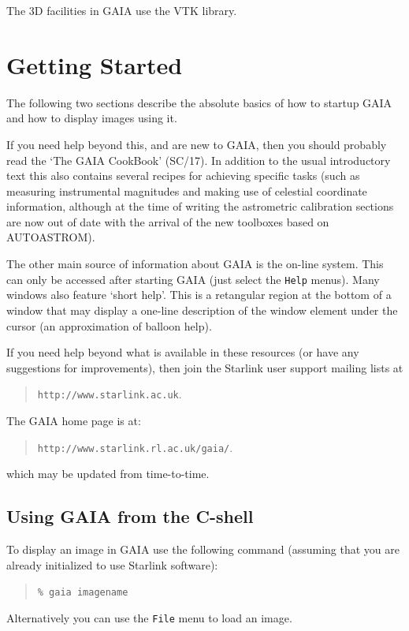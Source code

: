\documentclass[twoside,11pt]{article}
\newcommand{\htmladdnormallink}[2]{#1}
\newcommand{\xref}[3]{#1}
\newcommand{\xlabel}[1]{}
\renewcommand{\_}{\texttt{\symbol{95}}}
\newcommand{\mytt}[1]{{\texttt{#1}}}
\begin{document}
The 3D facilities in GAIA use the
\htmladdnormallink{VTK}{http://www.kitware.com} library.

\section{\xlabel{getting_started}Getting Started}

The following two sections describe the absolute basics of how to
startup GAIA and how to display images using it.

If you need help beyond this, and are new to GAIA, then you should probably
read the `The GAIA CookBook' (\xref{SC/17}{sc17}{}). In addition to the usual
introductory text this also contains several recipes for achieving specific
tasks (such as measuring instrumental magnitudes and making use of celestial
coordinate information, although at the time of writing the astrometric
calibration sections are now out of date with the arrival of the new toolboxes
based on AUTOASTROM).

The other main source of information about GAIA is the on-line
system. This can only be accessed after starting GAIA (just select the
\mytt{Help} menus). Many windows also feature `short help'. This is a
retangular region at the bottom of a window that may display a
one-line description of the window element under the cursor (an
approximation of balloon help).

If you need help beyond what is available in these resources (or have
any suggestions for improvements), then join the Starlink user support
mailing lists at
\begin{quote}
\htmladdnormallink{\mytt{http://www.starlink.ac.uk}}{http://www.starlink.ac.uk}.
\end{quote}
The GAIA home page is at:
\begin{quote}
\htmladdnormallink{\mytt{http://www.starlink.rl.ac.uk/gaia/}}{http://www.starlink.rl.ac.uk/gaia/}.
\end{quote}
which may be updated from time-to-time. 

\subsection{\xlabel{using_gaia_from_the_cshell}Using GAIA from the C-shell}

To display an image in GAIA use the following command
(assuming that you are already initialized to use Starlink software):
\begin{quote}
\mytt{\% gaia image\_name}
\end{quote}
Alternatively you can use the \mytt{File} menu to load an image.
\end{document}
